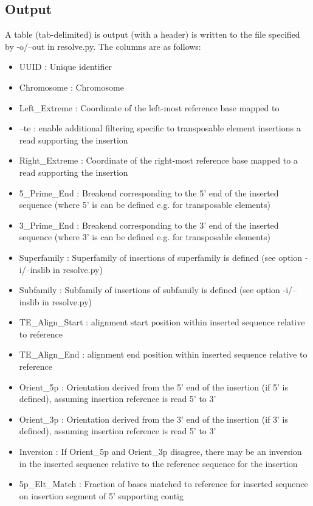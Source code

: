 \documentclass[letterpaper,11pt]{article}
\begin{document}
\subsection{Output}
A table (tab-delimited) is output (with a header) is written to the file specified by -o/--out in resolve.py. The columns are as follows:

\begin{itemize}
\item UUID : Unique identifier
\item Chromosome : Chromosome
\item Left\_Extreme : Coordinate of the left-most reference base mapped to\item --te : enable additional filtering specific to transposable element insertions a read supporting the insertion
\item Right\_Extreme : Coordinate of the right-most reference base mapped to a read supporting the insertion
\item 5\_Prime\_End : Breakend corresponding to the 5' end of the inserted sequence (where 5' is can be defined e.g. for transposable elements)
\item 3\_Prime\_End : Breakend corresponding to the 3' end of the inserted sequence (where 3' is can be defined e.g. for transposable elements)
\item Superfamily : Superfamily of insertions of superfamily is defined (see option -i/--inslib in resolve.py)
\item Subfamily : Subfamily of insertions of subfamily is defined (see option -i/--inslib in resolve.py)
\item TE\_Align\_Start : alignment start position within inserted sequence relative to reference
\item TE\_Align\_End : alignment end position within inserted sequence relative to reference
\item Orient\_5p : Orientation derived from the 5' end of the insertion (if 5' is defined), assuming insertion reference is read 5' to 3'
\item Orient\_3p : Orientation derived from the 3' end of the insertion (if 3' is defined), assuming insertion reference is read 5' to 3'
\item Inversion : If Orient\_5p and Orient\_3p disagree, there may be an inversion in the inserted sequence relative to the reference sequence for the insertion
\item 5p\_Elt\_Match : Fraction of bases matched to reference for inserted sequence on insertion segment of 5' supporting contig

\end{itemize}
\end{document}
